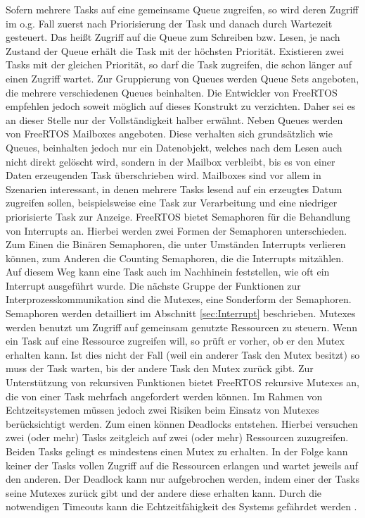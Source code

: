 Sofern mehrere Tasks auf eine gemeinsame Queue zugreifen, so wird deren Zugriff im o.g. Fall zuerst nach Priorisierung der Task und danach durch Wartezeit gesteuert. Das heißt Zugriff auf die Queue zum Schreiben bzw. Lesen, je nach Zustand der Queue erhält die Task mit der höchsten Priorität. Existieren zwei Tasks mit der gleichen Priorität, so darf die Task zugreifen, die schon länger auf einen Zugriff wartet.
Zur Gruppierung von Queues werden Queue Sets angeboten, die mehrere verschiedenen Queues beinhalten. Die Entwickler von FreeRTOS empfehlen jedoch soweit möglich auf dieses Konstrukt zu verzichten. Daher sei es an dieser Stelle nur der Voll\-stän\-dig\-keit halber erwähnt. Neben Queues werden von FreeRTOS Mailboxes angeboten. Diese verhalten sich grund\-sätz\-lich wie Queues, beinhalten jedoch nur ein Datenobjekt, welches nach dem Lesen auch nicht direkt gelöscht wird, sondern in der Mailbox verbleibt, bis es von einer Daten erzeugenden Task überschrieben wird. Mailboxes sind vor allem in Szenarien interessant, in denen mehrere Tasks lesend auf ein erzeugtes Datum zugreifen sollen, beispielsweise eine Task zur Verarbeitung und eine niedriger priorisierte Task zur Anzeige.
FreeRTOS bietet Semaphoren für die Behandlung von Interrupts an. Hierbei werden zwei Formen der Semaphoren unterschieden. Zum Einen die Binären Semaphoren, die unter Umständen Interrupts verlieren können, zum Anderen die Counting Semaphoren, die die Interrupts mitzählen. Auf diesem Weg kann eine Task auch im Nachhinein feststellen, wie oft ein Interrupt ausgeführt wurde.
Die nächste Gruppe der Funktionen zur Interprozesskommunikation sind die Mutexes, eine Sonderform der Semaphoren. Semaphoren werden detailliert im Abschnitt \ref{sec:Interrupt} beschrieben. Mutexes werden benutzt um Zugriff auf gemeinsam genutzte Ressourcen zu steuern. Wenn ein Task auf eine Ressource zugreifen will, so prüft er vorher, ob er den Mutex erhalten kann. Ist dies nicht der Fall (weil ein anderer Task den Mutex besitzt) so muss der Task warten, bis der andere Task den Mutex zurück gibt. Zur Unterstützung von rekursiven Funktionen bietet FreeRTOS rekursive Mutexes an, die von einer Task mehrfach angefordert werden können. Im Rahmen von Echtzeitsystemen müssen jedoch zwei Risiken beim Einsatz von Mutexes berücksichtigt werden. Zum einen können Deadlocks entstehen. Hierbei versuchen zwei (oder mehr) Tasks zeitgleich auf zwei (oder mehr) Ressourcen zuzugreifen. Beiden Tasks gelingt es mindestens einen Mutex zu erhalten. In der Folge kann keiner der Tasks vollen Zugriff auf die Ressourcen erlangen und wartet jeweils auf den anderen. Der Deadlock kann nur aufgebrochen werden, indem einer der Tasks seine Mutexes zurück gibt und der andere diese erhalten kann. Durch die notwendigen Timeouts kann die Echt\-zeit\-fähig\-keit des Systems gefährdet werden . %
